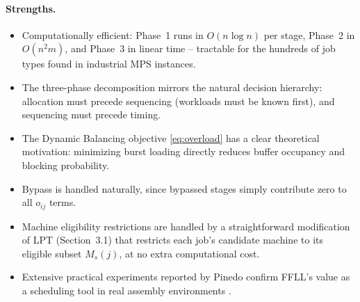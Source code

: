 \documentclass[11pt,a4paper]{article}
\begin{document}
\paragraph{Strengths.}
\begin{itemize}
  \item Computationally efficient: Phase~1 runs in $O(n \log n)$ per
    stage, Phase~2 in $O(n^2 m)$, and Phase~3 in linear time -- tractable
    for the hundreds of job types found in industrial MPS instances.
  \item The three-phase decomposition mirrors the natural decision
    hierarchy: allocation must precede sequencing (workloads must be
    known first), and sequencing must precede timing.
  \item The Dynamic Balancing objective \eqref{eq:overload} has a clear
    theoretical motivation: minimizing burst loading directly reduces
    buffer occupancy and blocking probability.
  \item Bypass is handled naturally, since bypassed stages simply
    contribute zero to all $o_{ij}$ terms.
  \item Machine eligibility restrictions are handled by a straightforward
    modification of LPT (Section~3.1) that restricts each job's candidate
    machine to its eligible subset $M_s(j)$, at no extra computational
    cost.
  \item Extensive practical experiments reported by Pinedo confirm FFLL's
    value as a scheduling tool in real assembly environments
    \citep{pinedo2016scheduling}.
\end{itemize}
\end{document}

